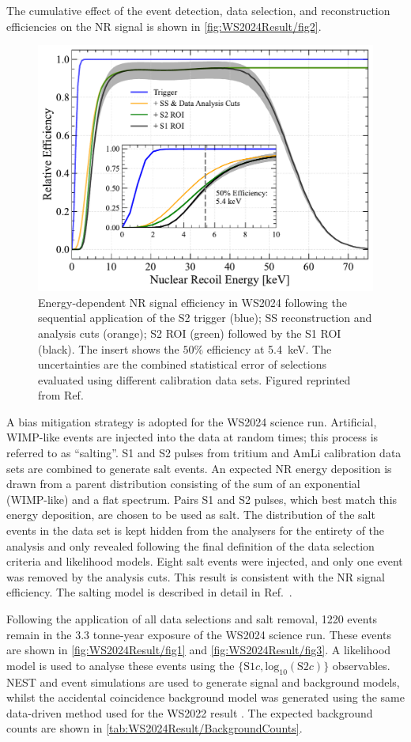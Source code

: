 The cumulative effect of the event detection, data selection, and reconstruction efficiencies on the NR signal is shown in \autoref{fig:WS2024Result/fig2}.
\begin{figure}[t!]
    \centering
    \includegraphics[width=0.7\linewidth]{figures/WS2024Result/figure2.pdf}
    \caption[Energy-dependent NR signal efficiency in the WS2024 analysis.]{Energy-dependent NR signal efficiency in WS2024 following the sequential application of the S2 trigger (blue); SS reconstruction and analysis cuts (orange); S2 ROI (green) followed by the S1 ROI (black). The insert shows the $50\%$ efficiency at 5.4~keV. The uncertainties are the combined statistical error of selections evaluated using different calibration data sets. Figured reprinted from Ref.~\cite{LZCollaboration:2024lux}}
    \label{fig:WS2024Result/fig2}
\end{figure}
A bias mitigation strategy is adopted for the WS2024 science run. Artificial, WIMP-like events are injected into the data at random times; this process is referred to as ``salting''. S1 and S2 pulses from tritium and AmLi calibration data sets are combined to generate salt events. An expected NR energy deposition is drawn from a parent distribution consisting of the sum of an exponential (WIMP-like) and a flat spectrum. Pairs S1 and S2 pulses, which best match this energy deposition, are chosen to be used as salt. The distribution of the salt events in the data set is kept hidden from the analysers for the entirety of the analysis and only revealed following the final definition of the data selection criteria and likelihood models. Eight salt events were injected, and only one event was removed by the analysis cuts. This result is consistent with the NR signal efficiency. The salting model is described in detail in Ref.~\cite{LZCollaboration:2024lux}.

Following the application of all data selections and salt removal, 1220 events remain in the 3.3 tonne-year exposure of the WS2024 science run. These events are shown in \autoref{fig:WS2024Result/fig1} and \autoref{fig:WS2024Result/fig3}. A likelihood model is used to analyse these events using the $\{\text{S1}c,\text{log}_{10}(\text{S2}c)\}$ observables. NEST and event simulations \cite{LZ_SIMS} are used to generate signal and background models, whilst the accidental coincidence background model was generated using the same data-driven method used for the WS2022 result \cite{LZ:2022lsv}. The expected background counts are shown in \autoref{tab:WS2024Result/BackgroundCounts}.

